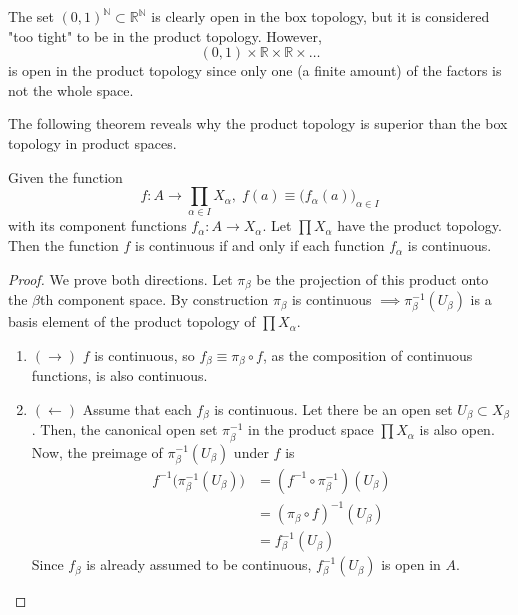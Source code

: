   \begin{example}
    The set $(0,1)^\mathbb{N} \subset \mathbb{R}^\mathbb{N}$ is clearly open in the box topology, but it is considered "too tight" to be in the product topology. However, 
    \begin{equation}
      (0,1) \times \mathbb{R} \times \mathbb{R} \times \ldots
    \end{equation}
    is open in the product topology since only one (a finite amount) of the factors is not the whole space. 
  \end{example}

  The following theorem reveals why the product topology is superior than the box topology in product spaces. 

  \begin{theorem}
    Given the function 
    \begin{equation}
      f: A \rightarrow \prod_{\alpha \in I} X_\alpha, \; f(a) \equiv \big( f_\alpha (a) \big)_{\alpha \in I}
    \end{equation}
    with its component functions $f_\alpha: A \rightarrow X_\alpha$. Let $\prod X_\alpha$ have the product topology. Then the function $f$ is continuous if and only if each function $f_\alpha$ is continuous. 
  \end{theorem}
  \begin{proof}
    We prove both directions. Let $\pi_\beta$ be the projection of this product onto the $\beta$th component space. By construction $\pi_\beta$ is continuous $\implies \pi_\beta^{-1} (U_\beta)$ is a basis element of the product topology of $\prod X_\alpha$. 
    \begin{enumerate}
      \item $(\rightarrow)$ $f$ is continuous, so $f_\beta \equiv \pi_\beta \circ f$, as the composition of continuous functions, is also continuous. 
      \item $(\leftarrow)$ Assume that each $f_\beta$ is continuous. Let there be an open set $U_\beta \subset X_\beta$. Then, the canonical open set $\pi_\beta^{-1}$ in the product space $\prod X_\alpha$ is also open. Now, the preimage of $\pi_\beta^{-1} (U_\beta)$ under $f$ is 
      \begin{align*}
        f^{-1} \big( \pi_\beta^{-1} (U_\beta)\big) & = (f^{-1} \circ \pi_\beta^{-1})(U_\beta) \\
        & = (\pi_\beta \circ f)^{-1} (U_\beta) \\
        & = f_\beta^{-1} (U_\beta)
      \end{align*}
      Since $f_\beta$ is already assumed to be continuous, $f_\beta^{-1} (U_\beta)$ is open in $A$. 
    \end{enumerate}
  \end{proof} 

